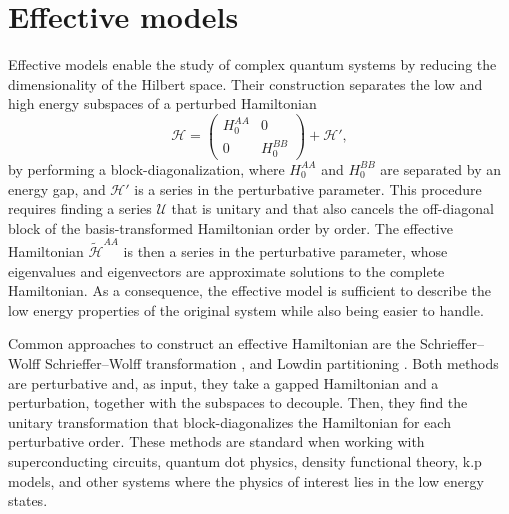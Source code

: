 \section{Effective models}

Effective models enable the study of complex quantum systems by reducing the
dimensionality of the Hilbert space.
Their construction separates the low and high energy subspaces of a
perturbed Hamiltonian
%
\begin{equation}
    \mathcal{H} = \begin{pmatrix}H_0^{AA} & 0 \\ 0 & H_0^{BB}\end{pmatrix} + \mathcal{H}',
\end{equation}
%
by performing a block-diagonalization, where $H_0^{AA}$ and $H_0^{BB}$ are
separated by an energy gap, and $\mathcal{H}'$ is a series in the perturbative
parameter.
This procedure requires finding a series $\mathcal{U}$ that is unitary and
that also cancels the off-diagonal block of the basis-transformed Hamiltonian
order by order.
The effective Hamiltonian $\tilde{\mathcal{H}}^{AA}$ is then a series in the
perturbative parameter, whose eigenvalues and eigenvectors are approximate
solutions to the complete Hamiltonian.
As a consequence, the effective model is sufficient to describe the low energy
properties of the original system while also being easier to handle.

Common approaches to construct an effective Hamiltonian are the Schrieffer--Wolff
Schrieffer--Wolff transformation
\cite{Schrieffer_1966}, \cite{Bravyi_2011}
and Lowdin partitioning \cite{White_1950}.
Both methods are perturbative and, as input, they take a gapped Hamiltonian and
a perturbation, together with the subspaces to decouple.
Then, they find the unitary transformation that block-diagonalizes the
Hamiltonian for each perturbative order.
These methods are standard when working with superconducting circuits,
quantum dot physics, density functional theory, k.p models, and other
systems where the physics of interest lies in the low energy states.

